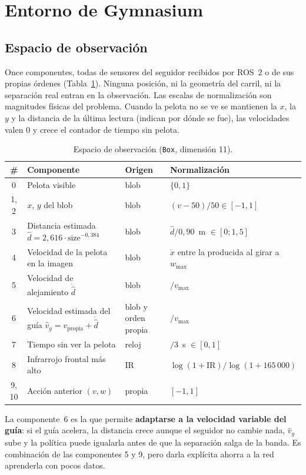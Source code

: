 \documentclass[11pt,a4paper]{article}
\newcommand{\cod}[1]{\texttt{\small #1}}
\begin{document}
\section{Entorno de Gymnasium}

\subsection{Espacio de observación}
Once componentes, todas de sensores del seguidor recibidos por ROS~2 o de sus propias órdenes
(Tabla~\ref{tab:obs}). Ninguna posición, ni la geometría del carril, ni la separación real entran en la
observación. Las escalas de normalización son magnitudes físicas del problema. Cuando la pelota no se ve se
mantienen la $x$, la $y$ y la distancia de la última lectura (indican por dónde se fue), las velocidades valen 0
y crece el contador de tiempo sin pelota.

\begin{table}[h]
\centering\small
\caption{Espacio de observación (\cod{Box}, dimensión 11).}
\label{tab:obs}
\begin{tabularx}{\linewidth}{@{}clll@{}}
\toprule
\# & Componente & Origen & Normalización \\
\midrule
0 & Pelota visible & blob & $\{0,1\}$ \\
1, 2 & $x$, $y$ del blob & blob & $(v-50)/50 \in [-1,1]$ \\
3 & Distancia estimada $\hat d = 2{,}616\cdot\text{size}^{-0{,}384}$ & blob & $\hat d/0{,}90$~m $\in[0;1{,}5]$ \\
4 & Velocidad de la pelota en la imagen & blob & $\dot x$ entre la producida al girar a $w_{\max}$ \\
5 & Velocidad de alejamiento $\dot{\hat d}$ & blob & $/v_{\max}$ \\
6 & Velocidad estimada del guía $\hat v_g = v_{\text{propia}} + \dot{\hat d}$ & blob y orden propia & $/v_{\max}$ \\
7 & Tiempo sin ver la pelota & reloj & $/3$~s $\in[0,1]$ \\
8 & Infrarrojo frontal más alto & IR & $\log(1+\text{IR})/\log(1+165\,000)$ \\
9, 10 & Acción anterior $(v,w)$ & propia & $[-1,1]$ \\
\bottomrule
\end{tabularx}
\end{table}

La componente~6 es la que permite \textbf{adaptarse a la velocidad variable del guía}: si el guía acelera, la
distancia crece aunque el seguidor no cambie nada, $\hat v_g$ sube y la política puede igualarla antes de que la
separación salga de la banda. Es combinación de las componentes 5 y 9, pero darla explícita ahorra a la red
aprenderla con pocos datos.
\end{document}

